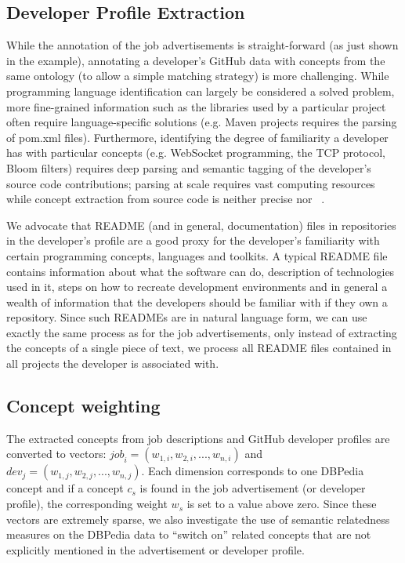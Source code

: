 \documentclass[conference]{IEEEtran}
\begin{document}
\subsection{Developer Profile Extraction}

While the annotation of the job advertisements is straight-forward (as just shown in the example), annotating a developer's GitHub data with concepts from the same ontology (to allow a simple
matching strategy) is more challenging. While programming language
identification can largely be considered a solved problem, more fine-grained
information such as the libraries used by a particular project often require
language-specific solutions (e.g. Maven projects requires the parsing of
\textsf{pom.xml} files). Furthermore, identifying the degree of familiarity a
developer has with particular concepts (e.g. WebSocket programming, the TCP
protocol, Bloom filters) requires deep parsing and semantic tagging of the
developer's source code contributions; parsing at scale requires vast computing
resources while concept extraction from source code is neither precise nor ~\cite{Kuhn07}.

We advocate that README (and in general, documentation) files in repositories in
the developer's profile are a good proxy for the developer's familiarity with
certain programming concepts, languages and toolkits. A typical README file
contains information about what the software can do, description of technologies
used in it, steps on how to recreate development environments and in general a
wealth of information that the developers should be familiar with if they own a
repository. Since such READMEs are in natural language form, we can use exactly
the same process as for the job advertisements, only instead of extracting the
concepts of a single piece of text, we process all README files contained in all
projects the developer is associated with. 

\subsection{Concept weighting}

The extracted concepts from job descriptions and GitHub developer profiles are converted
to vectors: $\textit{job}_i=(w_{1,i}, w_{2,i}, ..., w_{n,i})$ and $\textit{dev}_j=(w_{1,j},
w_{2,j}, ..., w_{n,j})$. Each dimension corresponds to one DBPedia concept and
if a concept $c_s$ is found in the job advertisement (or developer profile), the
corresponding weight $w_{s}$ is set to a value above zero. Since these vectors
are extremely sparse, we also investigate the use of semantic relatedness measures on the DBPedia data to ``switch on'' related concepts that are not explicitly mentioned in the
advertisement or developer profile.
\end{document}
